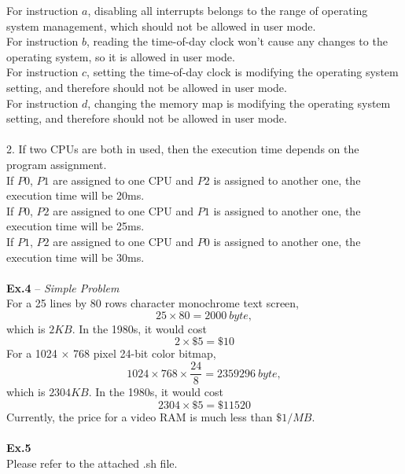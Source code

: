 \documentclass{article}
\begin{document}
For instruction $a$, disabling all interrupts belongs to the range of operating system management, which should not be allowed in user mode.\\
For instruction $b$, reading the time-of-day clock won't cause any changes to the operating system, so it is allowed in user mode.\\
For instruction $c$, setting the time-of-day clock is modifying the operating system setting, and therefore should not be allowed in user mode.\\
For instruction $d$, changing the memory map is modifying the operating system setting, and therefore should not be allowed in user mode.\\ \\
2. If two CPUs are both in used, then the execution time depends on the program assignment.\\
If $P0$, $P1$ are assigned to one CPU and $P2$ is assigned to another one, the execution time will be 20ms.\\
If $P0$, $P2$ are assigned to one CPU and $P1$ is assigned to another one, the execution time will be 25ms.\\
If $P1$, $P2$ are assigned to one CPU and $P0$ is assigned to another one, the execution time will be 30ms.\\ \\  
\noindent\textbf{Ex.4} -- \textit{Simple Problem}\\
For a 25 lines by 80 rows character monochrome text screen,
$$25 \times 80 = 2000\ byte,$$
which is $2KB$.
In the 1980s, it would cost
$$2\times\$5=\$10$$
For a 1024 $\times$ 768 pixel 24-bit color bitmap,
$$1024\times 768\times \frac{24}{8}=2359296\ byte,$$
which is $2304KB$.
In the 1980s, it would cost
$$2304\times \$5=\$11520$$
Currently, the price for a video RAM is much less than $\$1/MB$.\\ \\
\noindent\textbf{Ex.5}\\
Please refer to the attached .sh file.
\end{document}
